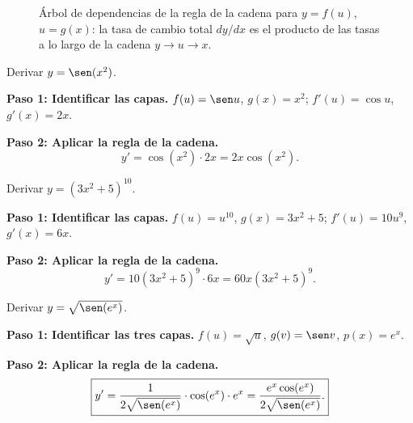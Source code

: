 \begin{figure}[!htbp]
\centering
{}
\caption{Árbol de dependencias de la regla de la cadena para $y=f(u)$,
  $u=g(x)$: la tasa de cambio total $dy/dx$ es el producto de las tasas
  a lo largo de la cadena $y\to u\to x$.}
\label{fig:arbol_cadena}
\end{figure}


\begin{example}
Derivar $y = \sen(x^2)$.

\begin{myproof}

\textbf{Paso 1: Identificar las capas.}
$f(u)=\sen u$, $g(x)=x^2$; $f'(u)=\cos u$, $g'(x)=2x$.

\textbf{Paso 2: Aplicar la regla de la cadena.}
\[
\boxed{y' = \cos(x^2)\cdot 2x = 2x\cos(x^2).}
\]
\end{myproof}
\end{example}

\begin{example}
Derivar $y = (3x^2+5)^{10}$.

\begin{myproof}

\textbf{Paso 1: Identificar las capas.}
$f(u)=u^{10}$, $g(x)=3x^2+5$; $f'(u)=10u^9$, $g'(x)=6x$.

\textbf{Paso 2: Aplicar la regla de la cadena.}
\[
\boxed{y' = 10(3x^2+5)^9\cdot 6x = 60x(3x^2+5)^9.}
\]
\end{myproof}
\end{example}

\begin{example}
Derivar $y = \sqrt{\sen(e^x)}$.

\begin{myproof}

\textbf{Paso 1: Identificar las tres capas.}
$f(u)=\sqrt{u}$, $g(v)=\sen v$, $p(x)=e^x$.

\textbf{Paso 2: Aplicar la regla de la cadena.}
\[
\boxed{y' = \frac{1}{2\sqrt{\sen(e^x)}}\cdot\cos(e^x)\cdot e^x
= \frac{e^x\cos(e^x)}{2\sqrt{\sen(e^x)}}.}
\]
\end{myproof}
\end{example}

